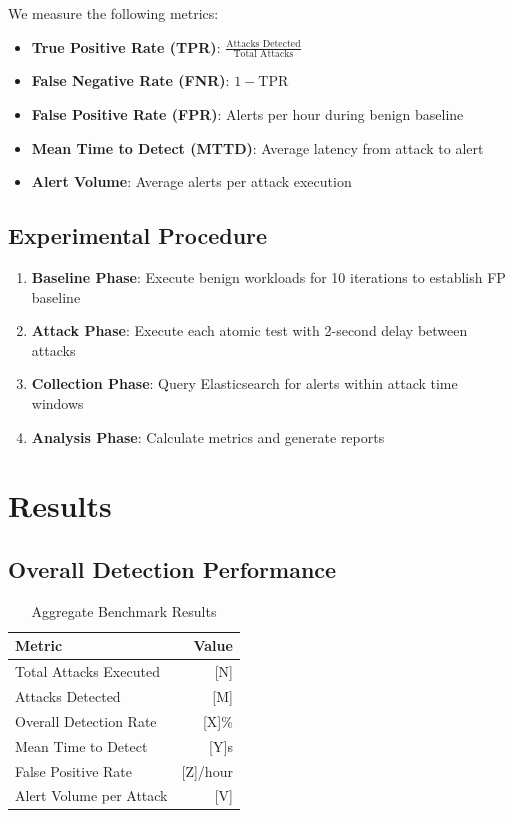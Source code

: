 \documentclass[11pt,a4paper]{article}
\begin{document}
We measure the following metrics:

\begin{itemize}
    \item \textbf{True Positive Rate (TPR)}: $\frac{\text{Attacks Detected}}{\text{Total Attacks}}$
    \item \textbf{False Negative Rate (FNR)}: $1 - \text{TPR}$
    \item \textbf{False Positive Rate (FPR)}: Alerts per hour during benign baseline
    \item \textbf{Mean Time to Detect (MTTD)}: Average latency from attack to alert
    \item \textbf{Alert Volume}: Average alerts per attack execution
\end{itemize}

\subsection{Experimental Procedure}

\begin{enumerate}
    \item \textbf{Baseline Phase}: Execute benign workloads for 10 iterations to establish FP baseline
    \item \textbf{Attack Phase}: Execute each atomic test with 2-second delay between attacks
    \item \textbf{Collection Phase}: Query Elasticsearch for alerts within attack time windows
    \item \textbf{Analysis Phase}: Calculate metrics and generate reports
\end{enumerate}

\section{Results}


\subsection{Overall Detection Performance}

\begin{table}[H]
    \centering
    \caption{Aggregate Benchmark Results}
    \begin{tabular}{lr}
        \toprule
        \textbf{Metric} & \textbf{Value} \\
        \midrule
        Total Attacks Executed & [N] \\
        Attacks Detected & [M] \\
        Overall Detection Rate & [X]\% \\
        Mean Time to Detect & [Y]s \\
        False Positive Rate & [Z]/hour \\
        Alert Volume per Attack & [V] \\
        \bottomrule
    \end{tabular}
\end{table}
\end{document}
